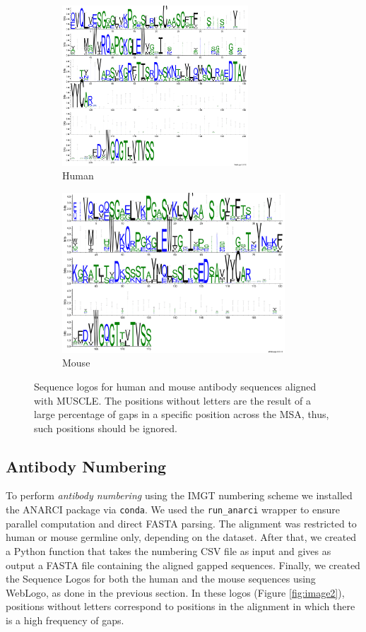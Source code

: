 \documentclass[11pt]{article}
\begin{document}
\begin{figure}[h]
	
	\begin{subfigure}{0.5\textwidth}
		\includegraphics[width=0.9\linewidth, height=6cm]{images/human_msa_muscle_logo.pdf} 
		\caption{Human}
	\end{subfigure}
	\begin{subfigure}{0.5\textwidth}
		\includegraphics[width=0.9\linewidth, height=6cm]{images/mouse_msa_muscle_logo.pdf}
		\caption{Mouse}
	\end{subfigure}
	
	\caption{\small Sequence logos for human and mouse antibody sequences aligned with MUSCLE. The positions without letters are the result of a large percentage of gaps in a specific position across the MSA, thus, such positions should be ignored.}
	\label{fig:muscle_logo}
\end{figure}

\subsection{Antibody Numbering}

To perform \textit{antibody numbering} using the IMGT numbering scheme \cite{IMGT} we installed the ANARCI package \cite{anarci} via \verb|conda|. We used the \verb|run_anarci| wrapper to ensure parallel computation and direct FASTA parsing. The alignment was restricted to human or mouse germline only, depending on the dataset. After that, we created a Python function that takes the numbering CSV file as input and gives as output a FASTA file containing the aligned gapped sequences.
Finally, we created the Sequence Logos for both the human and the mouse sequences using WebLogo, as done in the previous section. In these logos (Figure \ref{fig:image2}), positions without letters correspond to positions in the alignment in which there is a high frequency of gaps. 
\end{document}
